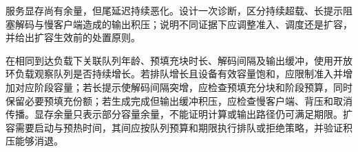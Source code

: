 \begin{exercises}
\begin{exercise} 服务显存尚有余量，但尾延迟持续恶化。设计一次诊断，区分持续超载、长提示阻塞解码与慢客户端造成的输出积压；说明不同证据下应调整准入、调度还是扩容，并给出扩容生效前的处置原则。

\begin{solution}
在相同到达负载下关联队列年龄、预填充块时长、解码间隔及输出缓冲，使用开放环负载观察队列是否持续增长。若排队增长且设备有效容量饱和，应限制准入并增加对应阶段容量；若长提示使解码间隔突增，应检查预填充分块和阶段预算，同时保留必要预填充份额；若生成完成但输出缓冲积压，应检查慢客户端、背压和取消传播。显存余量只表示部分容量余量，不能证明计算或输出路径仍可满足期限。扩容需要启动与预热时间，其间应按队列预算和期限执行排队或拒绝策略，并验证积压能够消退。
\end{solution}
\end{exercise}

\end{exercises}
